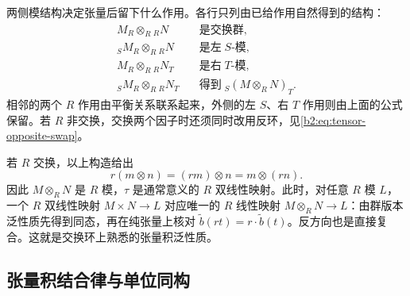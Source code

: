 两侧模结构决定张量后留下什么作用。各行只列由已给作用自然得到的结构：
\[
	\begin{aligned}
		M_R\otimes_R{}_RN&\quad\text{是交换群},\\
		{}_SM_R\otimes_R{}_RN&\quad\text{是左}\;S\text{-模},\\
		M_R\otimes_R{}_RN_T&\quad\text{是右}\;T\text{-模},\\
		{}_SM_R\otimes_R{}_RN_T&\quad\text{得到}\;{}_S(M\otimes_RN)_T.
	\end{aligned}
\]
相邻的两个 \(R\) 作用由平衡关系联系起来，外侧的左 \(S\)、右 \(T\) 作用则由上面的公式保留。若 \(R\) 非交换，交换两个因子时还须同时改用反环，见\cref{b2:eq:tensor-opposite-swap}。

\ProseParagraphBreak
若 \(R\) 交换，以上构造给出
\[
	r(m\otimes n)=(rm)\otimes n=m\otimes(rn).
\]
因此 \(M\otimes_RN\) 是 \(R\) 模，\(\tau\) 是通常意义的 \(R\) 双线性映射。此时，对任意 \(R\) 模 \(L\)，一个 \(R\) 双线性映射 \(M\times N\to L\) 对应唯一的 \(R\) 线性映射 \(M\otimes_RN\to L\)：由群版本泛性质先得到同态，再在纯张量上核对 \(\widetilde b(rt)=r\cdot\widetilde b(t)\)。反方向也是直接复合。这就是交换环上熟悉的张量积泛性质。

\subsection{张量积结合律与单位同构}
\label{b2:subsec:0602:02}

